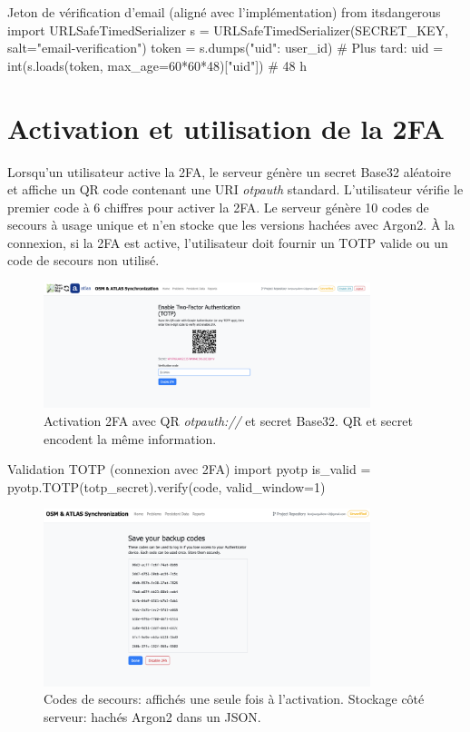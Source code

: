 \begin{codebox}[language=Python]{Jeton de vérification d'email (aligné avec l'implémentation)}
from itsdangerous import URLSafeTimedSerializer
s = URLSafeTimedSerializer(SECRET_KEY, salt="email-verification")
token = s.dumps({"uid": user_id})
# Plus tard:  uid = int(s.loads(token, max_age=60*60*48)["uid"])  # 48 h
\end{codebox}

\section{Activation et utilisation de la 2FA}
Lorsqu'un utilisateur active la 2FA, le serveur génère un secret Base32 aléatoire et affiche un QR code contenant une URI \textit{otpauth} standard. L'utilisateur vérifie le premier code à 6 chiffres pour activer la 2FA. Le serveur génère 10 codes de secours à usage unique et n'en stocke que les versions hachées avec Argon2. À la connexion, si la 2FA est active, l'utilisateur doit fournir un TOTP valide ou un code de secours non utilisé.

\begin{figure}[h]
  \centering
  \includegraphics[width=0.85\textwidth]{../figures/chap10/enable_up2fa.png}
  \caption{Activation 2FA avec QR \textit{otpauth://} et secret Base32. QR et secret encodent la même information.}
\end{figure}

\begin{codebox}[language=Python]{Validation TOTP (connexion avec 2FA)}
import pyotp
is_valid = pyotp.TOTP(totp_secret).verify(code, valid_window=1)
\end{codebox}

\begin{figure}[h]
  \centering
  \includegraphics[width=0.85\textwidth]{../figures/chap10/backupcodes.png}
  \caption{Codes de secours: affichés une seule fois à l'activation. Stockage côté serveur: hachés Argon2 dans un JSON.}
\end{figure}

